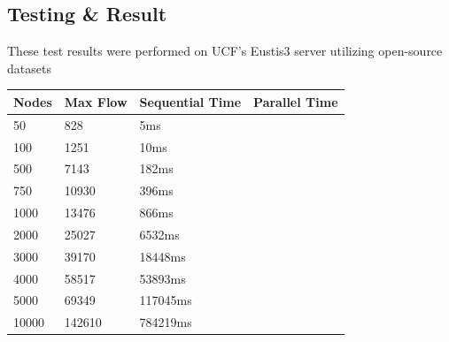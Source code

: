 \subsection{Testing \& Result}
    These test results were performed on UCF's Eustis3 server utilizing open-source datasets \cite{sumitpadhiyar}
    \begin{tabular}{ | m{4em} | m{5em }| m{5em} | m{5em} | } 
      \hline
      Nodes & Max Flow & Sequential Time & Parallel Time \\ 
      
        \hline
        50      & 828     & 5ms &\\
        \hline
        100     & 1251    & 10ms & \\  
        \hline
        500     & 7143    & 182ms & \\        
        \hline   
        750     & 10930   & 396ms & \\         
        \hline
        1000    & 13476   & 866ms & \\       
        \hline
        2000    & 25027   & 6532ms & \\
        \hline
        3000    & 39170   & 18448ms & \\       
        \hline
        4000    & 58517   & 53893ms & \\
        \hline
        5000    & 69349   & 117045ms & \\
        \hline
        10000   & 142610  & 784219ms & \\
        \hline
    \end{tabular}